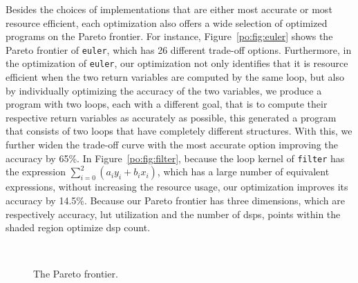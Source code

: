 Besides the choices of implementations that are either most accurate or most
resource efficient, each optimization also offers a wide selection of optimized
programs on the Pareto frontier.  For instance, Figure~\ref{po:fig:euler}
shows the Pareto frontier of \texttt{euler}, which has 26 different trade-off
options.  Furthermore, in the optimization of \texttt{euler}, our optimization
not only identifies that it is resource efficient when the two return variables
are computed by the same loop, but also by individually optimizing the
accuracy of the two variables, we produce a program with two loops, each with
a different goal, that is to compute their respective return variables as
accurately as possible, this generated a program that consists of two loops
that have completely different structures.  With this, we further widen the
trade-off curve with the most accurate option improving the accuracy by 65\%.
In Figure~\ref{po:fig:filter}, because the loop kernel of \texttt{filter}
has the expression $\sum_{i=0}^2{(a_i y_i + b_i x_i)}$, which has a large
number of equivalent expressions, without increasing the resource usage, our
optimization improves its accuracy by 14.5\%.  Because our Pareto frontier has
three dimensions, which are respectively accuracy, \gls{lut} utilization and
the number of \glspl{dsp}, points within the shaded region optimize \gls{dsp}
count.

\begin{figure}[ht]
    \centering
     \\
    \caption{The Pareto frontier.}
\end{figure}
